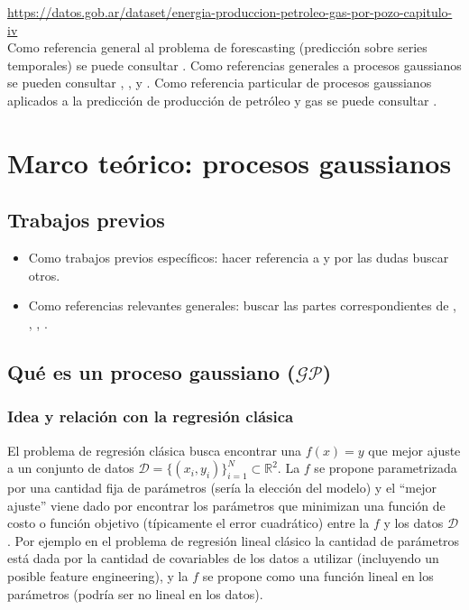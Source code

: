 \documentclass[a4paper]{article}
\newcommand{\gp}{\ensuremath{\mathcal{GP}}}
\begin{document}
\url{https://datos.gob.ar/dataset/energia-produccion-petroleo-gas-por-pozo-capitulo-iv}\\

Como referencia general al problema de forescasting (predicción sobre series temporales) se puede consultar \cite{hyndman}. Como referencias generales a procesos gaussianos se pueden consultar \cite{gramacy}, \cite{tobar}, \cite{rasmussen} y \cite{murphy}. Como referencia particular de procesos gaussianos aplicados a la predicción de producción de petróleo y gas se puede consultar \cite{gppaper1}.




\section{Marco teórico: procesos gaussianos}
\label{sec:marcoteorio}

\subsection{Trabajos previos}

\begin{itemize}
	\item Como trabajos previos específicos: hacer referencia a \cite{gppaper1} y por las dudas buscar otros.
	\item Como referencias relevantes generales: buscar las partes correspondientes de \cite{gramacy}, \cite{rasmussen}, \cite{murphy}, \cite{tobar}.
\end{itemize}


\subsection{Qué es un proceso gaussiano ($\gp$)}
\label{subsec:introGP}

\subsubsection{Idea y relación con la regresión clásica}
\label{subsubsec:ideagp}
El problema de regresión clásica busca encontrar una $f(x)=y$ que mejor ajuste a un conjunto de datos $\mathcal{D}=\{(x_i, y_i)\}_{i=1}^N \subset \mathbb{R}^2$. La $f$ se propone parametrizada por una cantidad fija de parámetros (sería la elección del modelo) y el ``mejor ajuste'' viene dado por encontrar los parámetros que minimizan una función de costo o función objetivo (típicamente el error cuadrático) entre la $f$ y los datos $\mathcal{D}$. Por ejemplo en el problema de regresión lineal clásico la cantidad de parámetros está dada por la cantidad de covariables de los datos a utilizar (incluyendo un posible feature engineering), y la $f$ se propone como una función lineal en los parámetros (podría ser no lineal en los datos).
\end{document}
